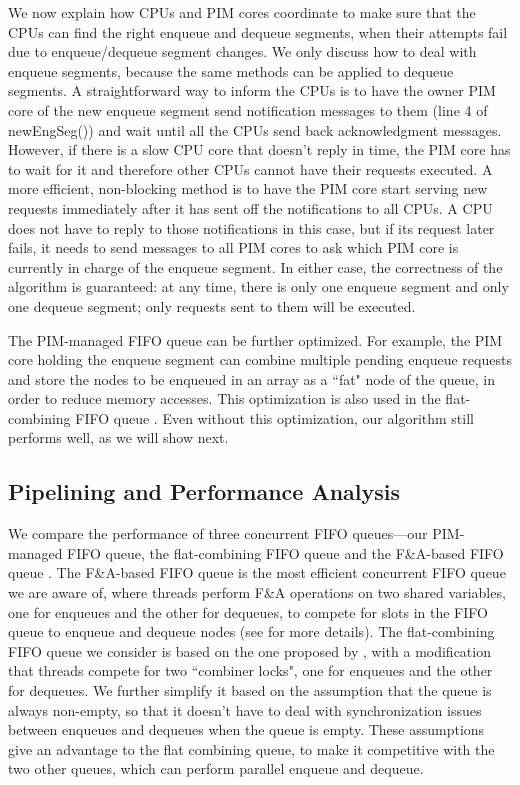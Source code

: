 We now explain how CPUs and PIM cores coordinate to make sure that the CPUs can find the right enqueue 
and dequeue segments, when their attempts fail due to enqueue/dequeue segment changes. 
We only discuss how to deal with enqueue segments, 
because the same methods can be applied to dequeue segments. 
A straightforward way to inform the CPUs is to have the owner PIM core of the new enqueue segment 
send notification messages to them (line 4 of newEngSeg()) 
and wait until all the CPUs send back acknowledgment messages. 
However, if there is a slow CPU core that doesn't reply in time, 
the PIM core has to wait for it and therefore other CPUs cannot have their requests executed. 
A more efficient, non-blocking method is to have the PIM core start serving new requests 
immediately after it has sent off the notifications to all CPUs. 
A CPU does not have to reply to those notifications in this case, 
but if its request later fails, it needs to send messages to all PIM cores 
to ask which PIM core is currently in charge of the enqueue segment.
In either case, the correctness of the algorithm is guaranteed:  
at any time, there is only one enqueue segment and only one dequeue segment; 
only requests sent to them will be executed. 
  
The PIM-managed FIFO queue can be further optimized. 
For example, the PIM core holding the enqueue segment can combine multiple pending enqueue requests 
and store the nodes to be enqueued in an array as a ``fat" node of the queue, 
in order to reduce memory accesses. 
This optimization is also used in the flat-combining FIFO queue \cite{Hendler10}. 
Even without this optimization, our algorithm still performs well, as we will show next. 

\subsection{Pipelining and Performance Analysis}
We compare the performance of three concurrent FIFO queues---our PIM-managed FIFO queue, 
the flat-combining FIFO queue and the F\&A-based FIFO queue \cite{Morrison13}. 
The F\&A-based FIFO queue is the most efficient concurrent FIFO queue we are aware of, 
where threads perform F\&A operations on two shared variables, 
one for enqueues and the other for dequeues, to compete for slots in the FIFO queue to 
enqueue and dequeue nodes (see \cite{Morrison13} for more details). 
The flat-combining FIFO queue we consider is based on the one proposed by \cite{Hendler10}, 
with a modification that threads compete for two ``combiner locks", 
one for enqueues and the other for dequeues. 
We further simplify it based on the assumption that the queue is always non-empty, 
so that it doesn't have to deal with synchronization issues between enqueues and dequeues 
when the queue is empty. These assumptions give an advantage to the flat combining queue, 
to make it competitive with the two other queues, which can perform parallel enqueue and dequeue. 

